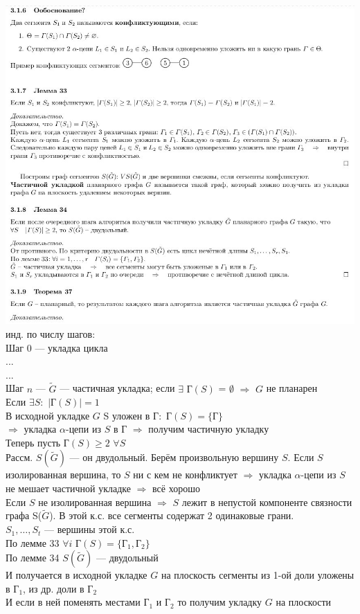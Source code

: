 \documentclass[12pt]{article}
\begin{document}
		\includegraphics[width=600pt]{7}\\
		инд. по числу шагов:\\
		Шаг 0 — укладка цикла\\
		...\\
		...\\
		Шаг $n$ — $\widetilde{G}$ — частичная укладка; если $\exists$ $Г(S)$ = $\emptyset$ $\Rightarrow$ $G$ не планарен\\
		Если $\exists S:$ $|Г(S)| = 1$\\
		В исходной укладке $G$ S уложен в $Г:$ $Г(S) = \{Г\}$\\ $\Rightarrow$ укладка $\alpha$-цепи из $S$ в $Г$ $\Rightarrow$ получим частичную укладку\\
		Теперь пусть $Г(S) \geqslant 2$ $\forall S$\\
		Рассм. $S(\widetilde{G})$ — он двудольный. Берём произвольную вершину $S$. Если $S$ изолированная вершина, то $S$ ни с кем не конфликтует $\Rightarrow$ укладка $\alpha$-цепи из $S$ не мешает частичной укладке $\Rightarrow$ всё хорошо\\
		Если $S$ не изолированная вершина $\Rightarrow$ $S$ лежит в непустой компоненте связности графа S($\widetilde{G}$). В этой к.с. все сегменты содержат 2 одинаковые грани.\\
		$S_1,\dotsc,S_t$ — вершины этой к.с.\\
		По лемме 33 $\forall i$ $Г(S) = \{Г_1, Г_2\}$\\
		По лемме 34 $S(\widetilde{G})$ — двудольный\\
		И получается в исходной укладке $G$ на плоскость сегменты из 1-ой доли уложены в $Г_1$, из др. доли в $Г_2$\\
		И если в ней поменять местами $Г_1$ и $Г_2$ то получим укладку $G$ на плоскости\\
	\qedsymbol
\end{document}

